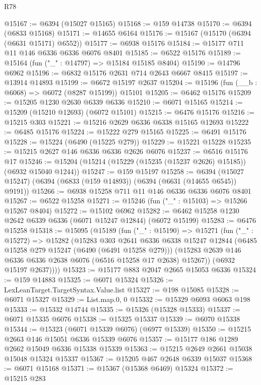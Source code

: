 \begin{lexlean}{R78}
\begin{coremodule}
@15167 := @6394 (@15027 @15165)
@15168 := @159 @14738
@15170 := @6394 (@6833 @15168)
@15171 := @14655 @6164
@15176 := @15167 (@15170 (@6394 (@6631 @15171) @6552))
@15177 := @6938 @15176
@15184 := @15177 @711 @11 @146 @6336 @6336 @6076 @8401
@15185 := @6522 @15176
@15189 := @15164 (fun ("_" : @14797) => @15184 @15185 @8404)
@15190 := @14796 @6962
@15196 := @6832 @15176 @2631 @714 @2643 @6667 @8415
@15197 := @13914 @14893
@15199 := @6672 @15197 @2637
@15204 := @15196 (fun (__b : @6068) => @6072 (@8287 @15199)) @15101
@15205 := @6462 @15176
@15209 := @15205 @1230 @2630 @6339 @6336
@15210 := @6071 @15165
@15214 := @15209 (@15210 @12693) (@6072 @15101)
@15215 := @6476 @15176
@15216 := @15215 @303
@15221 := @15216 @2629 @6336 @6338 @15165 @12693
@15222 := @6485 @15176
@15224 := @15222 @279 @15165
@15225 := @6491 @15176
@15228 := @15224 (@6490 (@15225 @279))
@15229 := @15221 @15228
@15235 := @15215 @2627 @146 @6336 @6336 @2626 @6076
@15237 := @6516 @15176 @17
@15246 := @15204 (@15214 (@15229 (@15235 (@15237 @2626) @15185)) (@6932 @15040 @1244))
@15247 := @159 @15197
@15258 := @6394 (@15027 @15247) (@6394 (@6833 (@159 @14893)) (@6394 (@6631 (@14655 @6545)) @9191))
@15266 := @6938 @15258 @711 @11 @146 @6336 @6336 @6076 @8401
@15267 := @6522 @15258
@15271 := @15246 (fun ("_" : @15103) => @15266 @15267 @8404)
@15272 := @15102 @6962
@15282 := @6462 @15258 @1230 @2642 @6339 @6336 (@6071 @15247 @12844) (@6072 @15199)
@15283 := @6476 @15258
@15318 := @15095
    (@15189
      (fun ("_" : @15190) =>
      @15271
        (fun ("_" : @15272) =>
        @15282
          (@15283
            @303
            @2641
            @6336
            @6338
            @15247
            @12844
            (@6485 @15258 @279 @15247 (@6490 (@6491 @15258 @279)))
            (@15283 @2639 @146 @6336 @6336 @2638 @6076 (@6516 @15258 @17 @2638) @15267))
          (@6932 @15197 @2637))))
@15323 := @15177 @883 @2047 @2665 @15053 @6336
@15324 := @159 @14883
@15325 := @6071 @15324
@15326 := LexLeanTarget.TargetSyntax.Value.list
@15327 := @198 @15085
@15328 := @6071 @15327
@15329 := List.map.{0, 0}
@15332 := @15329 @6093 @6063 @198
@15333 := @15332 @14744
@15335 := @15326 (@15328 @15333)
@15337 := @6071 @15335 @6076
@15338 := @15325 @15337
@15339 := @6070 @15338
@15344 := @15323 (@6071 @15339 @6076) (@6977 @15339)
@15350 := @15215 @2663 @146 @15051 @6336 @15339 @6076
@15357 := @15177 @186 @1289 @2662 @15049 @6336 @15338 @15339
@15363 := @15215 @2649 @2661 @15038 @15048 @15324 @15337
@15367 := @15205 @467 @2648 @6339 @15037
@15368 := @6071 @15168
@15371 := @15367 (@15368 @6469) @15324
@15372 := @15215 @283

\end{coremodule}
\end{lexlean}
